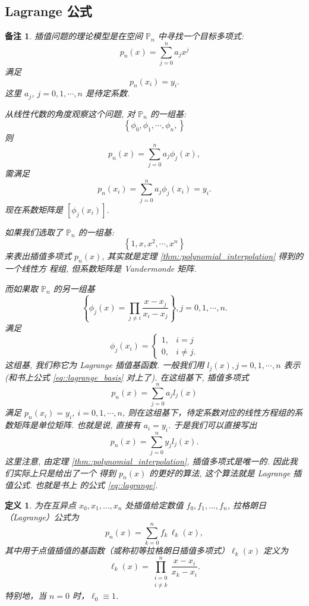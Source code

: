 \documentclass[a4paper]{ctexart}
\newtheorem{remark}{备注}
\newtheorem{definition}[theorem]{定义} %
\numberwithin{theorem}{section}
\numberwithin{equation}{section}
\numberwithin{figure}{section}
\numberwithin{remark}{section}
\begin{document}
\subsection{Lagrange 公式}
\begin{remark}
插值问题的理论模型是在空间 $\mathbb{P}_n$ 中寻找一个目标多项式:
$$
p_n(x) = \sum_{j = 0}^n a_j x^j
$$
满足
$$
p_n(x_i) = y_i.
$$
这里 $a_j$, $j = 0, 1, \cdots, n$ 是待定系数.

从线性代数的角度观察这个问题, 
对 $\mathbb{P}_n$ 的一组基:
$$
\left\{
\phi_0, \phi_1, \cdots, \phi_n,
\right\}
$$
则
$$
p_n(x) = \sum_{j = 0}^n a_j \phi_j(x),
$$
需满足
$$
p_n(x_i) = \sum_{j = 0}^n a_j \phi_j(x_i) = y_i.
$$
现在系数矩阵是 $\left[\phi_j(x_i)\right]$. 

如果我们选取了
$\mathbb{P}_n$ 的一组基:
$$
\left\{1, x, x^2, \cdots, x^n\right\}
$$
来表出插值多项式 $p_n(x)$, 
其实就是定理 \ref{thm::polynomial_interpolation} 得到的一个线性方
程组, 但系数矩阵是 Vandermonde 矩阵. 


而如果取 $\mathbb{P}_n$ 的另一组基
$$
\left\{\phi_j(x) = \prod_{j \neq i}\frac{x - x_j}{x_i - x_j}
\right\}, j = 0, 1, \cdots, n.
$$
满足
$$
\phi_j(x_i) = \left\{
\begin{array}{ll}
  1,& i = j \\
  0,& i \neq j.
\end{array}
\right.
$$
这组基, 我们称它为 Lagrange 插值基函数. 一般我们用 $l_j(x), j = 0, 1, \cdots, n$
表示(和书上公式 \ref{eq::lagrange_basis} 对上了). 在这组基下, 插值多项式
$$
p_n(x) = \sum_{j = 0}^n a_j l_j(x)
$$
满足 $p_n(x_i) = y_i$, $i = 0, 1, \cdots, n$,
则在这组基下，待定系数对应的线性方程组的系数矩阵是单位矩阵. 也就是说,
直接有 $a_i = y_i$. 于是我们可以直接写出
$$
p_n(x) = \sum_{j = 0}^n y_j l_j(x).
$$
这里注意, 由定理 \ref{thm::polynomial_interpolation}, 插值多项式是唯一的. 因此我们实际上只是给出了一个
得到 $p_n(x)$ 的更好的算法, 这个算法就是 Lagrange 插值公式. 也就是书上
的公式 \ref{eq::lagrange}.    
\end{remark}

\begin{definition}
    \label{def::lagrange}
为在互异点 $x_0,x_1,\ldots,x_n$ 处插值给定数值 $f_0,f_1,\ldots,f_n$, 拉格朗日（Lagrange）公式为
\begin{equation}
    \label{eq::lagrange}
p_n(x)=\sum_{k=0}^{n} f_k\,\ell_k(x),
\end{equation}
其中用于点值插值的基函数（或称初等拉格朗日插值多项式）$\ell_k(x)$ 定义为
\begin{equation}
    \label{eq::lagrange_basis}
\ell_k(x)=\prod_{\substack{i=0\\ i\ne k}}^{n}\frac{x-x_i}{x_k-x_i}.
\end{equation}
特别地，当 $n=0$ 时，$\ell_0\equiv 1$.
\end{definition}
\end{document}
